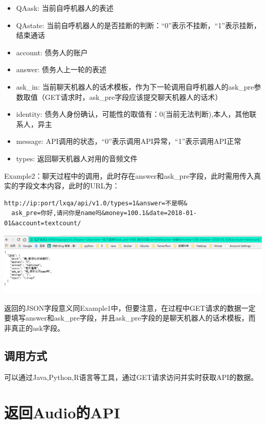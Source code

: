 \documentclass[]{book}
\begin{document}
\begin{itemize}
\item
  QAask: 当前自呼机器人的表述
\item
  QAstate:
  当前自呼机器人的是否挂断的判断：``0''表示不挂断，``1''表示挂断，结束通话
\item
  account: 债务人的账户
\item
  answer: 债务人上一轮的表述
\item
  ask\_in:
  当前聊天机器人的话术模板，作为下一轮调用自呼机器人的ask\_pre参数取值（GET请求时，ask\_pre字段应该提交聊天机器人的话术）
\item
  identity:
  债务人身份确认，可能性的取值有：0(当前无法判断),本人，其他联系人，异主
\item
  message: API调用的状态，``0''表示调用API异常，``1''表示调用API正常
\item
  types: 返回聊天机器人对用的音频文件
\end{itemize}

Example2：聊天过程中的调用，此时存在answer和ask\_pre字段，此时需用传入真实的字段文本内容，此时的URL为：

\begin{verbatim}
http://ip:port/lxqa/api/v1.0/types=1&answer=不是啊&
  ask_pre=你好,请问你是name吗&money=100.1&date=2018-01-01&account=textcount/
\end{verbatim}

\begin{center}\includegraphics[width=1.5\linewidth,height=1.5\textheight]{img/2-2} \end{center}

返回的JSON字段意义同Example1中，但要注意，在过程中GET请求的数据一定要填写answer和ask\_pre字段，并且ask\_pre字段的是聊天机器人的话术模板，而非真正的ask字段。

\section{\texorpdfstring{\textbf{调用方式}}{调用方式}}

可以通过Java,Python,R语言等工具，通过GET请求访问并实时获取API的数据。

\chapter{返回Audio的API}\label{audio-api}
\end{document}

